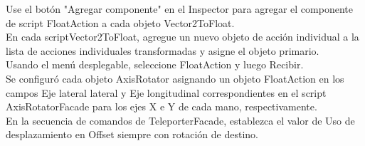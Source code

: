 Use el botón "Agregar componente" en el Inspector para agregar el componente de script FloatAction a cada objeto Vector2ToFloat.\\

En cada scriptVector2ToFloat, agregue un nuevo objeto de acción individual a la lista de acciones individuales transformadas y asigne el objeto primario.\\

Usando el menú desplegable, seleccione FloatAction y luego Recibir.\\

Se configuró cada objeto AxisRotator asignando un objeto FloatAction en los campos Eje lateral lateral y Eje longitudinal correspondientes en el script AxisRotatorFacade para los ejes X e Y de cada mano, respectivamente.\\


En la secuencia de comandos de TeleporterFacade, establezca el valor de Uso de desplazamiento en Offset siempre con rotación de destino.\\

